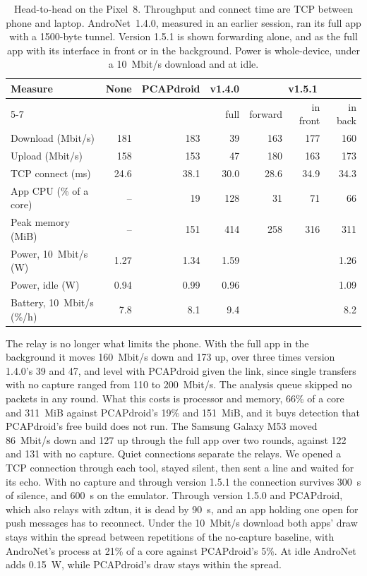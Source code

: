 \documentclass[runningheads]{llncs}
\begin{document}
\begin{table}[t]
\centering
\caption{Head-to-head on the Pixel~8. Throughput and connect time are TCP between phone and laptop. AndroNet~1.4.0, measured in an earlier session, ran its full app with a 1500-byte tunnel. Version 1.5.1 is shown forwarding alone, and as the full app with its interface in front or in the background. Power is whole-device, under a 10~Mbit/s download and at idle.}\label{tab:headtohead}
\small
\begin{tabular}{@{}lrrrrrr@{}}
\toprule
Measure & None & PCAPdroid & v1.4.0 & \multicolumn{3}{c}{v1.5.1} \\
\cmidrule(l){5-7}
 & & & full & forward & in front & in back \\
\midrule
Download (Mbit/s) & 181 & 183 & 39 & 163 & 177 & 160 \\
Upload (Mbit/s) & 158 & 153 & 47 & 180 & 163 & 173 \\
TCP connect (ms) & 24.6 & 38.1 & 30.0 & 28.6 & 34.9 & 34.3 \\
App CPU (\% of a core) & -- & 19 & 128 & 31 & 71 & 66 \\
Peak memory (MiB) & -- & 151 & 414 & 258 & 316 & 311 \\
\midrule
Power, 10~Mbit/s (W) & 1.27 & 1.34 & 1.59 & & & 1.26 \\
Power, idle (W) & 0.94 & 0.99 & 0.96 & & & 1.09 \\
Battery, 10~Mbit/s (\%/h) & 7.8 & 8.1 & 9.4 & & & 8.2 \\
\bottomrule
\end{tabular}
\end{table}

The relay is no longer what limits the phone. With the full app in the background it moves 160~Mbit/s down and 173 up, over three times version 1.4.0's 39 and 47, and level with PCAPdroid given the link, since single transfers with no capture ranged from 110 to 200~Mbit/s. The analysis queue skipped no packets in any round. What this costs is processor and memory, 66\% of a core and 311~MiB against PCAPdroid's 19\% and 151~MiB, and it buys detection that PCAPdroid's free build does not run. The Samsung Galaxy M53 moved 86~Mbit/s down and 127 up through the full app over two rounds, against 122 and 131 with no capture. Quiet connections separate the relays. We opened a TCP connection through each tool, stayed silent, then sent a line and waited for its echo. With no capture and through version 1.5.1 the connection survives 300~s of silence, and 600~s on the emulator. Through version 1.5.0 and PCAPdroid, which also relays with zdtun, it is dead by 90~s, and an app holding one open for push messages has to reconnect. Under the 10~Mbit/s download both apps' draw stays within the spread between repetitions of the no-capture baseline, with AndroNet's process at 21\% of a core against PCAPdroid's 5\%. At idle AndroNet adds 0.15~W, while PCAPdroid's draw stays within the spread.
\end{document}
